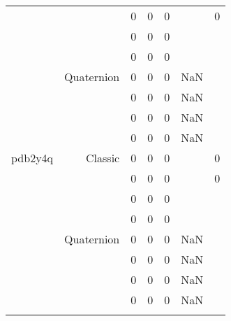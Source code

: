 \begin{xltabular}{\textwidth}{r|rcccSc}
& & 0 & 0 & 0 & & 0 \\
& & 0 & 0 & 0 & & \\
& & 0 & 0 & 0 & & \\
& Quaternion & 0 & 0 & 0 & NaN & \\
& & 0 & 0 & 0 & NaN & \\
& & 0 & 0 & 0 & NaN & \\
& & 0 & 0 & 0 & NaN & \\ \addlinespace
pdb2y4q & Classic & 0 & 0 & 0 & & 0 \\
& & 0 & 0 & 0 & & 0 \\
& & 0 & 0 & 0 & & \\
& & 0 & 0 & 0 & & \\
& Quaternion & 0 & 0 & 0 & NaN & \\
& & 0 & 0 & 0 & NaN & \\
& & 0 & 0 & 0 & NaN & \\
& & 0 & 0 & 0 & NaN & \\ \addlinespace
\end{xltabular}
